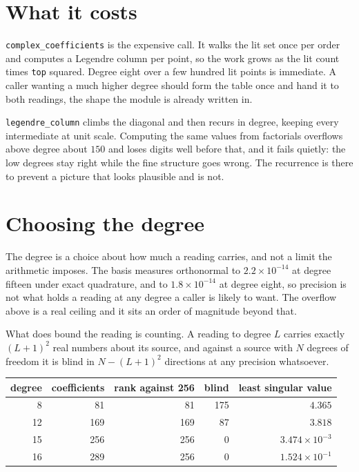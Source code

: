 \section{What it costs}

\texttt{complex\_coefficients} is the expensive call. It walks the lit set once per order and computes a Legendre column per point, so the work grows as the lit count times \texttt{top} squared. Degree eight over a few hundred lit points is immediate. A caller wanting a much higher degree should form the table once and hand it to both readings, the shape the module is already written in.

\texttt{legendre\_column} climbs the diagonal and then recurs in degree, keeping every intermediate at unit scale. Computing the same values from factorials overflows above degree about \(150\) and loses digits well before that, and it fails quietly: the low degrees stay right while the fine structure goes wrong. The recurrence is there to prevent a picture that looks plausible and is not.

\section{Choosing the degree}

The degree is a choice about how much a reading carries, and not a limit the arithmetic imposes. The basis measures orthonormal to \(2.2 \times 10^{-14}\) at degree fifteen under exact quadrature, and to \(1.8 \times 10^{-14}\) at degree eight, so precision is not what holds a reading at any degree a caller is likely to want. The overflow above is a real ceiling and it sits an order of magnitude beyond that.

What does bound the reading is counting. A reading to degree \(L\) carries exactly \((L+1)^2\) real numbers about its source, and against a source with \(N\) degrees of freedom it is blind in \(N - (L+1)^2\) directions at any precision whatsoever.

\begin{center}
\begin{tabular}{@{}rrrrr@{}}
\toprule
degree & coefficients & rank against 256 & blind & least singular value \\
\midrule
8 & 81 & 81 & 175 & \(4.365\) \\
12 & 169 & 169 & 87 & \(3.818\) \\
15 & 256 & 256 & 0 & \(3.474 \times 10^{-3}\) \\
16 & 289 & 256 & 0 & \(1.524 \times 10^{-1}\) \\
\bottomrule
\end{tabular}
\end{center}

